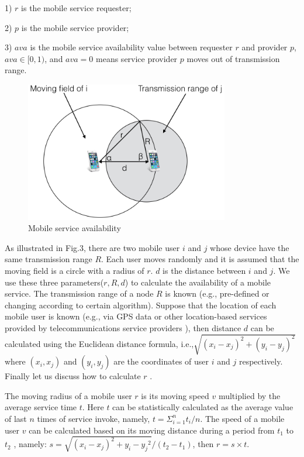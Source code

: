\documentclass[10pt,journal,compsoc]{IEEEtran}
\begin{document}
​1) $r$ is the mobile service requester;

​2) $p$ is the mobile service provider;

​3) $ava$ is the mobile service availability value between requester $r$ and provider $p$, $ava \in [0,1)$, and $ava=0$ means service provider $p$ moves out of transmission range.


\begin{figure}[!t]
\centering
\includegraphics[width=3.5in]{./img/pic3.png}
\caption{Mobile service availability}
\label{fig_sd}
\end{figure}

As illustrated in Fig.3, there are two mobile user $i$ and $j$ whose device have the same transmission range $R$. Each user moves randomly and it is assumed that the moving field is a circle with a radius of $r$. $d$ is the distance between $i$ and $j$. We use these three parameters($r,R,d$) to calculate the availability of a mobile service. The transmission range of a node $R$ is known (e.g., pre-defined or changing according to certain algorithm). Suppose that the location of each mobile user is known (e.g., via GPS data or other location-based services provided by telecommunications service providers \cite{chadil2008real}), then distance $d$ can be calculated using the Euclidean distance formula, i.e.,$\sqrt{{(x_i-x_j)^2}+({y_i-y_j})^2}$ where $(x_i, x_j)$ and $(y_i, y_j)$ are the coordinates of user $i$ and $j$ respectively. Finally let us discuss how to calculate $r$ \cite{Yang2010}.

The moving radius of a mobile user $r$ is its moving speed $v$ multiplied by the average service time $t$. Here $t$ can be statistically calculated as the average value of last $n$ times of service invoke, namely, $t = \Sigma_{i=1}^{n}t_i/n$. The speed of a mobile user $v$ can be calculated based on its moving distance during a period from $t_1$ to $t_2$ \cite{ko2000location}, namely: $s = \sqrt{{(x_i-x_j)^2}+{y_i-y_j}^2}/(t_2-t_1)$, then $r = s \times t$.
\end{document}
